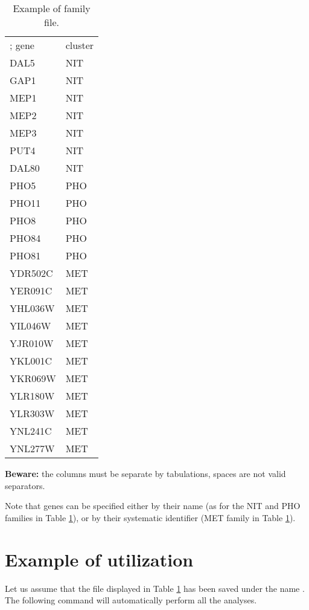 \begin{table}
\begin{center}
\begin{tabular}{ll}
\hline
; gene & cluster \\
DAL5 & NIT \\
GAP1 & NIT \\
MEP1 & NIT \\
MEP2 & NIT \\
MEP3 & NIT \\
PUT4 & NIT \\
DAL80 & NIT \\
PHO5 & PHO \\
PHO11 & PHO \\
PHO8 & PHO \\
PHO84 & PHO \\
PHO81 & PHO \\
YDR502C & MET \\
YER091C & MET \\
YHL036W & MET \\
YIL046W & MET \\
YJR010W & MET \\
YKL001C & MET \\
YKR069W & MET \\
YLR180W & MET \\
YLR303W & MET \\
YNL241C & MET \\
YNL277W & MET \\
\hline
\end{tabular}
\end{center}
\caption{\label{table:cluster_file} Example of family file.}
\end{table}

\textbf{Beware:} the columns must be separate by tabulations, spaces
are not valid separators.

Note that genes can be specified either by their name (as for the NIT
and PHO families in Table \ref{table:cluster_file}), or by their
systematic identifier (MET family in Table \ref{table:cluster_file}).


\section{Example of utilization}

Let us assume that the file displayed in Table
\ref{table:cluster_file} has been saved under the name
. The following command will automatically perform all
the analyses.

